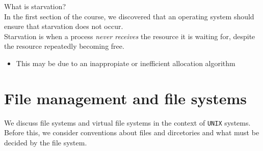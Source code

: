 \documentclass[journal, letterpaper]{IEEEtran}
\begin{document}
\begin{aside}{What is starvation?} \\
    In the first section of the course, we discovered that an operating system should ensure that starvation does not occur.
    \newline \\ 
    Starvation is when a process \textit{never receives} the resource it is waiting for, despite the resource repeatedly becoming free.
    \begin{itemize}
        \item This may be due to an inappropiate or inefficient allocation algorithm
    \end{itemize}
\end{aside}
\section{File management and file systems}
We discuss file systems and virtual file systems in the context of \verb|UNIX| systems. Before this, we consider conventions about files and dircetories and what must be decided by the file system.
\end{document}
